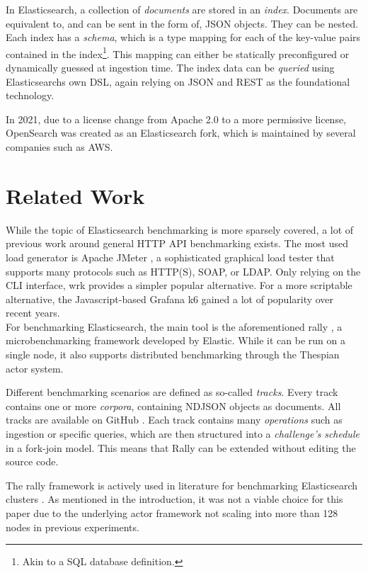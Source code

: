 In Elasticsearch, a collection of \emph{documents} are stored in an \emph{index}. Documents are equivalent to, and can be sent in the form of, \ac{JSON} objects. They can be nested. Each index has a \emph{schema}, which is a type mapping for each of the key-value pairs contained in the index\footnote{Akin to a SQL database definition.}. This mapping can either be statically preconfigured or dynamically guessed at ingestion time. The index data can be \emph{queried} using Elasticsearchs own \ac{DSL}, again relying on \ac{JSON} and REST as the foundational technology.

In 2021, due to a license change from Apache 2.0 to a more permissive license, OpenSearch was created as an Elasticsearch fork, which is maintained by several companies such as AWS.

\section{Related Work}
While the topic of Elasticsearch benchmarking is more sparsely covered, a lot of previous work around general HTTP API benchmarking exists. The most used load generator is Apache JMeter \cite{jmeter}, a sophisticated graphical load tester that supports many protocols such as HTTP(S), SOAP, or LDAP. Only relying on the \ac{CLI} interface, wrk \cite{wrk} provides a simpler popular alternative. For a more scriptable alternative, the Javascript-based Grafana k6 \cite{k6} gained a lot of popularity over recent years.\\

For benchmarking Elasticsearch, the main tool is the aforementioned rally \cite{rally}, a microbenchmarking framework developed by Elastic. While it can be run on a single node, it also supports distributed benchmarking through the Thespian actor system.

Different benchmarking scenarios are defined as so-called \emph{tracks}. Every track contains one or more \emph{corpora}, containing \ac{NDJSON} objects as documents. All tracks are available on GitHub \cite{rallytracks}. Each track contains many \emph{operations} such as ingestion or specific queries, which are then structured into a \emph{challenge's} \emph{schedule} in a fork-join model. This means that Rally can be extended without editing the source code.

The rally framework is actively used in literature for benchmarking Elasticsearch clusters \cite{rallyusecase1} \cite{rallyusecase2} \cite{rallyusecase3}. As mentioned in the introduction, it was not a viable choice for this paper due to the underlying actor framework not scaling into more than 128 nodes in previous experiments.

